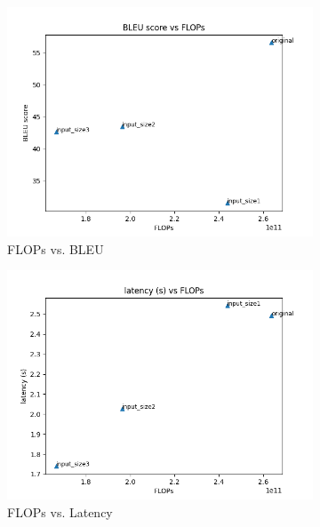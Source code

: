 \documentclass[11pt]{article}
\begin{document}
\begin{figure}[h]
    \centering
    \begin{subfigure}{0.32\textwidth}
        \includegraphics[width=\textwidth]{images/input_size/BLEU_vs_FLOP.png}
        \caption{FLOPs vs. BLEU}
    \end{subfigure}
    \begin{subfigure}{0.32\textwidth}
        \includegraphics[width=\textwidth]{images/input_size/latency_vs_FLOP.png}
        \caption{FLOPs vs. Latency}
    \end{subfigure}
    \begin{subfigure}{0.32\textwidth}

\end{subfigure}
\end{figure}
\end{document}
